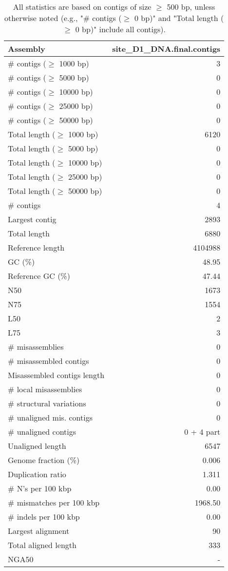 \documentclass[12pt,a4paper]{article}
\begin{document}
\begin{table}[ht]
\begin{center}
\caption{All statistics are based on contigs of size $\geq$ 500 bp, unless otherwise noted (e.g., "\# contigs ($\geq$ 0 bp)" and "Total length ($\geq$ 0 bp)" include all contigs).}
\begin{tabular}{|l*{1}{|r}|}
\hline
Assembly & site\_D1\_DNA.final.contigs \\ \hline
\# contigs ($\geq$ 1000 bp) & 3 \\ \hline
\# contigs ($\geq$ 5000 bp) & 0 \\ \hline
\# contigs ($\geq$ 10000 bp) & 0 \\ \hline
\# contigs ($\geq$ 25000 bp) & 0 \\ \hline
\# contigs ($\geq$ 50000 bp) & 0 \\ \hline
Total length ($\geq$ 1000 bp) & 6120 \\ \hline
Total length ($\geq$ 5000 bp) & 0 \\ \hline
Total length ($\geq$ 10000 bp) & 0 \\ \hline
Total length ($\geq$ 25000 bp) & 0 \\ \hline
Total length ($\geq$ 50000 bp) & 0 \\ \hline
\# contigs & 4 \\ \hline
Largest contig & 2893 \\ \hline
Total length & 6880 \\ \hline
Reference length & 4104988 \\ \hline
GC (\%) & 48.95 \\ \hline
Reference GC (\%) & 47.44 \\ \hline
N50 & 1673 \\ \hline
N75 & 1554 \\ \hline
L50 & 2 \\ \hline
L75 & 3 \\ \hline
\# misassemblies & 0 \\ \hline
\# misassembled contigs & 0 \\ \hline
Misassembled contigs length & 0 \\ \hline
\# local misassemblies & 0 \\ \hline
\# structural variations & 0 \\ \hline
\# unaligned mis. contigs & 0 \\ \hline
\# unaligned contigs & 0 + 4 part \\ \hline
Unaligned length & 6547 \\ \hline
Genome fraction (\%) & 0.006 \\ \hline
Duplication ratio & 1.311 \\ \hline
\# N's per 100 kbp & 0.00 \\ \hline
\# mismatches per 100 kbp & 1968.50 \\ \hline
\# indels per 100 kbp & 0.00 \\ \hline
Largest alignment & 90 \\ \hline
Total aligned length & 333 \\ \hline
NGA50 & - \\ \hline
\end{tabular}
\end{center}
\end{table}
\end{document}
